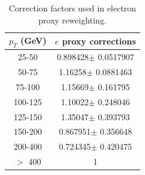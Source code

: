 \begin{table}[htdp]
	\centering
  \begin{tabular}{|c|c|}
  \hline
  $p_T$ (GeV)  & $e$ proxy corrections \\ \hline
  25-50  & 0.898428$\pm$ 0.0517907  \\ \hline
  50-75  & 1.16258$\pm$ 0.0881463  \\ \hline
  75-100  & 1.15669$\pm$ 0.161795  \\ \hline
  100-125  & 1.10022$\pm$ 0.248046  \\ \hline
  125-150  & 1.35047$\pm$ 0.393793  \\ \hline
  150-200  & 0.867951$\pm$ 0.356648  \\ \hline
  200-400  & 0.724345$\pm$ 0.420475  \\ \hline
  $>$ 400 & 1 \\ \hline
  \end{tabular}
  \caption{Correction factors used in electron proxy reweighting.}
  \label{table:correctionsfakelep}
\end{table}
